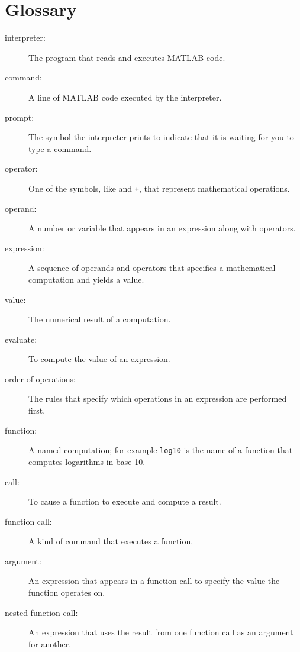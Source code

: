\documentclass{book}
\begin{document}
\section{Glossary}

\begin{description}

\item[interpreter:] The program that reads and executes MATLAB code.

\item[command:] A line of MATLAB code executed by the interpreter.

\item[prompt:] The symbol the interpreter prints to indicate that it is
waiting for you to type a command.

\item[operator:] One of the symbols, like {\tt *} and {\tt +}, that
represent mathematical operations.   

\item[operand:] A number or variable that appears in an expression along
with operators.

\item[expression:] A sequence of operands and operators that specifies
a mathematical computation and yields a value.   

\item[value:] The numerical result of a computation.   

\item[evaluate:] To compute the value of an expression.   

\item[order of operations:] The rules that specify which operations
in an expression are performed first.

\item[function:] A named computation; for example {\tt log10} is the
name of a function that computes logarithms in base 10.

\item[call:] To cause a function to execute and compute a result.   

\item[function call:] A kind of command that executes a function.   

\item[argument:] An expression that appears in a function call to
specify the value the function operates on.

\item[nested function call:] An expression that uses the result from
one function call as an argument for another.   


\end{description}
\end{document}
